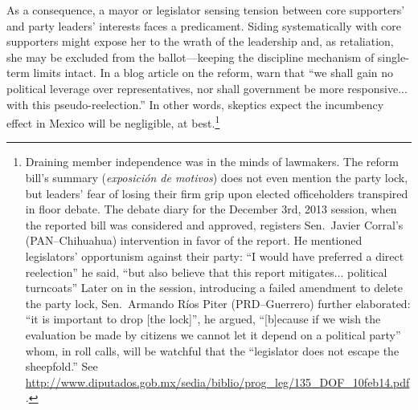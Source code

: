 \documentclass[letter,12pt]{article}
\begin{document}
As a consequence, a mayor or legislator sensing tension between core supporters' and party leaders' interests faces a predicament. Siding systematically with core supporters might expose her to the wrath of the leadership and, as retaliation, she may be excluded from the ballot---keeping the discipline mechanism of single-term limits \citep{weldon.1997} intact. In a blog article on the reform, \citet{merinoFierroZarkin2013Blog} warn that ``we shall gain no political leverage over representatives, nor shall government be more responsive... with this pseudo-reelection.'' In other words, skeptics expect the incumbency effect in Mexico will be negligible, at best.\footnote{Draining member independence was in the minds of lawmakers. The reform bill's summary (\emph{exposición de motivos}) does not even mention the party lock, but leaders' fear of losing their firm grip upon elected officeholders transpired in floor debate. The debate diary for the December 3rd, 2013 session, when the reported bill was considered and approved, registers Sen.\ Javier Corral's (PAN--Chihuahua) intervention in favor of the report. He mentioned legislators' opportunism against their party: ``I would have preferred a direct reelection'' he said, ``but also believe that this report mitigates... political turncoats'' Later on in the session, introducing a failed amendment to delete the party lock, Sen.\ Armando Ríos Piter (PRD--Guerrero) further elaborated: ``it is important to drop [the lock]'', he argued, ``[b]ecause if we wish the evaluation be made by citizens we cannot let it depend on a political party'' whom, in roll calls, will be watchful that the ``legislator does not escape the sheepfold.'' See \url{http://www.diputados.gob.mx/sedia/biblio/prog_leg/135_DOF_10feb14.pdf}.}



\end{document}
